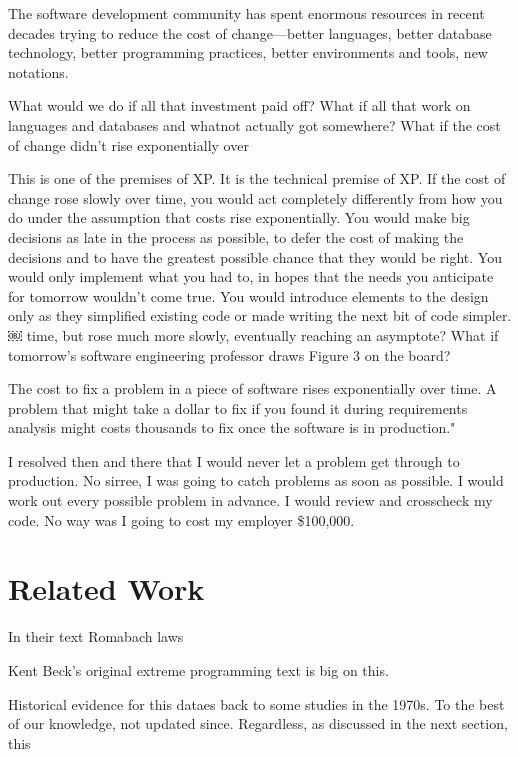\documentclass{sig-alternate}
\begin{document}
The software development community has spent enormous resources in recent decades trying to reduce the cost of change—better languages, better database technology, better programming practices, better environments and tools, new notations.

What would we do if all that investment paid off? What if all that work on languages and databases and whatnot actually got somewhere? What if the cost of change didn't rise exponentially over

This is one of the premises of XP. It is the technical premise of XP. If the cost of change rose slowly over time, you would act completely differently from how you do under the assumption that costs rise exponentially. You would make big decisions as late in the process as possible, to defer the cost of making the decisions and to have the greatest possible chance that they would be right. You would only implement what you had to, in hopes that the needs you anticipate for tomorrow wouldn't come true. You would introduce elements to the design only as they simplified existing code or made writing the next bit of code simpler.
￼
time, but rose much more slowly, eventually reaching an asymptote? What if tomorrow's software engineering professor draws Figure 3 on the board?

The cost to fix a problem in a piece of software rises exponentially over time. A problem that might take a dollar to fix if you found it during requirements analysis might costs thousands to fix once the software is in production."

I resolved then and there that I would never let a problem get through to production. No sirree, I was going to catch problems as soon as possible. I would work out every possible problem in advance. I would review and crosscheck my code. No way was I going to cost my employer \$100,000.


\section{Related Work}

In their text Romabach laws

Kent Beck's original extreme programming text is big on this.

Historical  evidence for this dataes back to some studies in the 1970s. To the best of
our knowledge, not updated since. Regardless, as discussed in the next section, this


\end{document}
